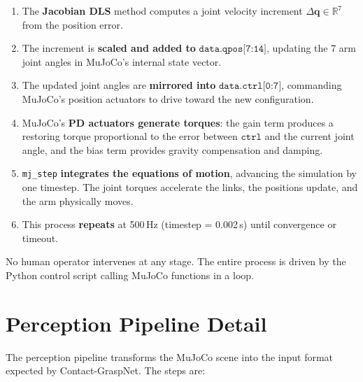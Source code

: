 \documentclass[11pt,a4paper]{report}
\begin{document}
\begin{enumerate}
  \item The \textbf{Jacobian DLS} method computes a joint velocity increment $\Delta\mathbf{q} \in \mathbb{R}^7$ from the position error.

  \item The increment is \textbf{scaled and added to} $\texttt{data.qpos[7:14]}$, updating the 7 arm joint angles in MuJoCo's internal state vector.

  \item The updated joint angles are \textbf{mirrored into} $\texttt{data.ctrl[0:7]}$, commanding MuJoCo's position actuators to drive toward the new configuration.

  \item MuJoCo's \textbf{PD actuators generate torques}: the gain term produces a restoring torque proportional to the error between $\texttt{ctrl}$ and the current joint angle, and the bias term provides gravity compensation and damping.

  \item \texttt{mj\_step} \textbf{integrates the equations of motion}, advancing the simulation by one timestep. The joint torques accelerate the links, the positions update, and the arm physically moves.

  \item This process \textbf{repeats} at 500\,Hz (timestep = 0.002\,s) until convergence or timeout.
\end{enumerate}

No human operator intervenes at any stage. The entire process is driven by the Python control script calling MuJoCo functions in a loop.

\section{Perception Pipeline Detail}
\label{sec:perception_pipeline}

The perception pipeline transforms the MuJoCo scene into the input format expected by Contact-GraspNet. The steps are:
\end{document}
